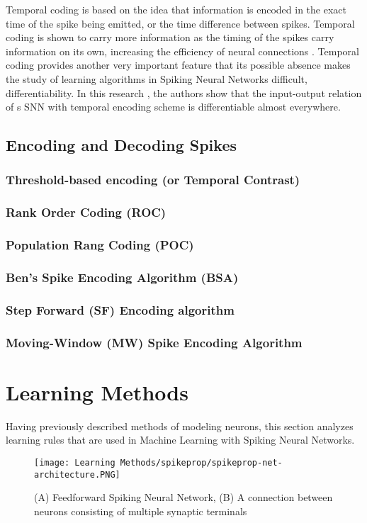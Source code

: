 \documentclass[12pt]{report}
\begin{document}
Temporal coding is based on the idea that information is encoded in the exact time of the spike being emitted, or the time difference between spikes. Temporal coding is shown to carry more information as the timing of the spikes carry information on its own, increasing the efficiency of neural connections \cite{Mainen2009}. Temporal coding provides another very important feature that its possible absence makes the study of learning algorithms in Spiking Neural Networks difficult, differentiability. In this research \cite{Mostafa2018}, the authors show that the input-output relation of s SNN with temporal encoding scheme is differentiable almost everywhere. 

\subsection{Encoding and Decoding Spikes}
\subsubsection{Threshold-based encoding (or Temporal Contrast)}
\subsubsection{Rank Order Coding (ROC)}
\subsubsection{Population Rang Coding (POC)}
\subsubsection{Ben’s Spike Encoding Algorithm (BSA)}
\subsubsection{Step Forward (SF) Encoding algorithm}
\subsubsection{Moving-Window (MW) Spike Encoding Algorithm}

\section{Learning Methods}
Having previously described methods of modeling neurons, this section analyzes learning rules that are used in Machine Learning with Spiking Neural Networks.
\begin{figure}[htp]
    \centering
    \texttt{[image: Learning Methods/spikeprop/spikeprop-net-architecture.PNG]}
    \caption{(A) Feedforward Spiking Neural Network, (B) A connection between neurons consisting of multiple synaptic terminals}
    \label{fig:spikeprop-net-architecture}
\end{figure}
\end{document}
